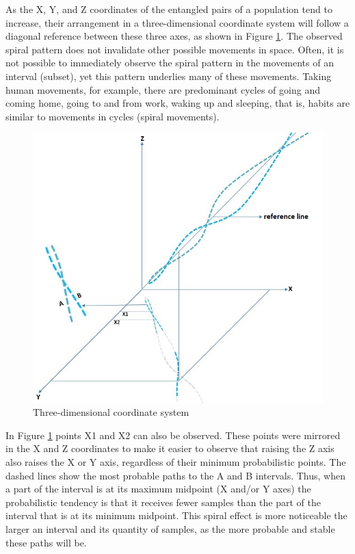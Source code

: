 As the X, Y, and Z coordinates of the entangled pairs of a population tend to increase, their arrangement in a three-dimensional coordinate system will follow a diagonal reference between these three axes, as shown in Figure \ref{fig:consciousness_space_spiral_reference_line}. The observed spiral pattern does not invalidate other possible movements in space. Often, it is not possible to immediately observe the spiral pattern in the movements of an interval (subset), yet this pattern underlies many of these movements.  Taking human movements, for example, there are predominant cycles of going and coming home, going to and from work, waking up and sleeping, that is, habits are similar to movements in cycles (spiral movements).
	\begin{figure}[H]
	\caption{Three-dimensional coordinate system}
	\label{fig:consciousness_space_spiral_reference_line}
	\centering
	\includegraphics[scale=.6]{sections/images/consciousness_space_spiral_reference_line.jpg}
	\end{figure}

In Figure \ref{fig:consciousness_space_spiral_reference_line} points X1 and X2 can also be observed. These points were mirrored in the X and Z coordinates to make it easier to observe that raising the Z axis also raises the X or Y axis, regardless of their minimum probabilistic points. The dashed lines show the most probable paths to the A and B intervals. Thus, when a part of the interval is at its maximum midpoint (X and/or Y axes) the probabilistic tendency is that it receives fewer samples than the part of the interval that is at its minimum midpoint. This spiral effect is more noticeable the larger an interval and its quantity of samples, as the more probable and stable these paths will be.

